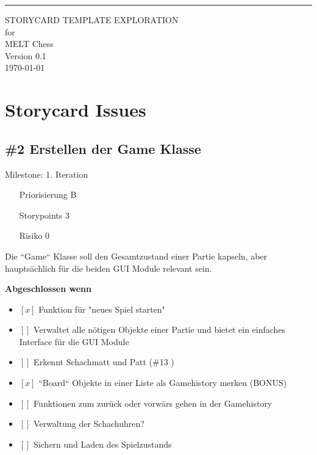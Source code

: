 \documentclass{scrreprt}
\date{}
\def\myversion{0.1 }
\begin{document}
\begin{flushright}
    \rule{16cm}{5pt}\vskip1cm
    \begin{bfseries}
        \Huge{STORYCARD TEMPLATE EXPLORATION}\\
        \vspace{1.5cm}
        for\\
        \vspace{1.5cm}
        MELT Chess\\
        \vspace{1.5cm}
        \LARGE{Version \myversion}\\
        \vspace{1.5cm}
        \vspace{1.5cm}
        \today\\
    \end{bfseries}
\end{flushright}

\newpage
\section{Storycard Issues}
\subsection*{\#2 Erstellen der Game Klasse}
Milestone: 1. Iteration\\

\begin{itemize}
\item[Priorisierung] B
\item[Storypoints] 3
\item[Risiko] 0
\end{itemize}

Die ``Game`` Klasse soll den Gesamtzustand einer Partie kapseln, aber hauptsächlich für die beiden GUI Module relevant sein.

\textbf{Abgeschlossen wenn}
\begin{itemize}
\item $[x]$ Funktion für "neues Spiel starten"
\item $[ ]$ Verwaltet alle nötigen Objekte einer Partie und bietet ein einfaches Interface für die GUI Module
\item $[ ]$ Erkennt Schachmatt und Patt (\#13 )
\item $[x]$ ``Board`` Objekte in einer Liste als Gamehistory merken (BONUS)
\item $[ ]$ Funktionen zum zurück oder vorwärs gehen in der Gamehistory
\item $[ ]$ Verwaltung der Schachuhren?
\item $[ ]$ Sichern und Laden des Spielzustands
\end{itemize}
\end{document}

